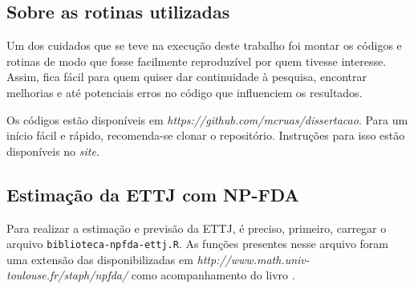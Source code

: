 \documentclass[
	12pt,				%
	openright,			%
	oneside,			%
	a4paper,			%
	english,			%
	brazil				%
	]{dissertacao-ufrgs-abntex2}
\begin{document}
\begin{apendicesenv}
%
%
%
%
%
%
%
%
%


\chapter{Sobre as rotinas utilizadas}

Um dos cuidados que se teve na execução deste trabalho foi montar os códigos e rotinas de modo que fosse facilmente reproduzível por quem tivesse interesse. Assim, fica fácil para quem quiser dar continuidade à pesquisa, encontrar melhorias e até potenciais erros no código que influenciem os resultados.

Os códigos estão disponíveis em \emph{https://github.com/mcruas/dissertacao}. Para um início fácil e rápido, recomenda-se clonar o repositório. Instruções para isso estão disponíveis no \emph{site}.

\section{Estimação da ETTJ com NP-FDA}
Para realizar a estimação e previsão da ETTJ, é preciso, primeiro, carregar o arquivo \texttt{biblioteca-npfda-ettj.R}. As funções presentes nesse arquivo foram uma extensão das disponibilizadas em \emph{http://www.math.univ-toulouse.fr/staph/npfda/} como acompanhamento do livro .


\end{apendicesenv}
\end{document}
